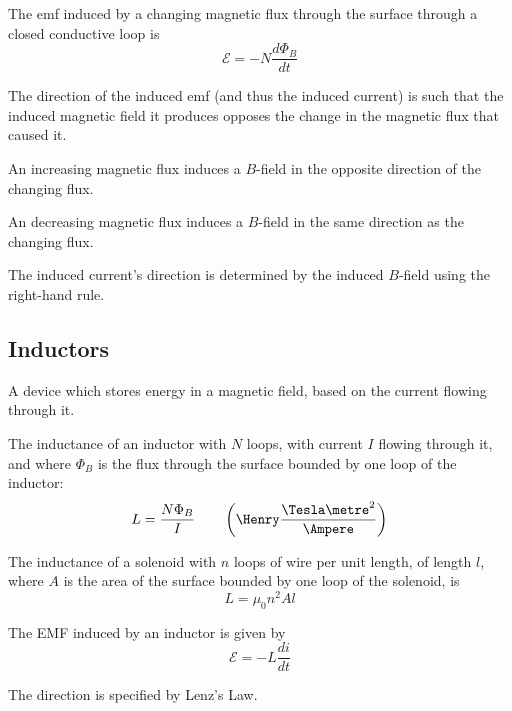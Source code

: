 \begin{namedlaw}
  The emf induced by a changing magnetic flux through the surface through a closed conductive loop is
  \[
    \mathcal{E} = - N \frac{d\Phi_B}{dt}
  \]
\end{namedlaw}

\begin{namedlaw}
  The direction of the induced emf (and thus the induced current) is such that the induced magnetic field it produces opposes the change in the magnetic flux that caused it.
\end{namedlaw}

\begin{theorem}
  An increasing magnetic flux induces a $B$-field in the opposite direction of the changing flux.

  An decreasing magnetic flux induces a $B$-field in the same direction as the changing flux.

  The induced current's direction is determined by the induced $B$-field using the right-hand rule.
\end{theorem}

\subsection{Inductors}

\begin{definition}
  A device which stores energy in a magnetic field, based on the current flowing through it.
\end{definition}

\begin{definition}[Inductance]
  The inductance of an inductor with $N$ loops, with current $I$ flowing through it, and where $\Phi_B$ is the flux through the surface bounded by one loop of the inductor:
  \[
    L = \frac{N \Phi_B}{I} \qquad \left( \Henry \frac{\Tesla \metre^2}{\Ampere} \right)
  \]
\end{definition}

\begin{theorem}
  The inductance of a solenoid with $n$ loops of wire per unit length, of length $l$, where $A$ is the area of the surface bounded by one loop of the solenoid, is
  \[
    L = \mu_0 n^2 A l
  \]
\end{theorem}

\begin{theorem}
  The EMF induced by an inductor is given by 
  \[
    \mathcal{E} = - L \frac{di}{dt}
  \]

  The direction is specified by Lenz's Law.
\end{theorem}

